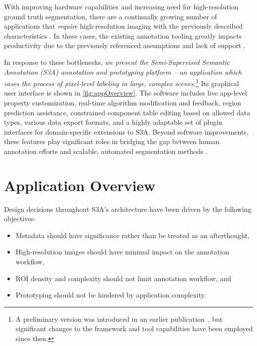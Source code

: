 With improving hardware capabilities and increasing need for high-resolution ground truth segmentation, there are a continually growing number of applications that \emph{require} high-resolution imaging with the previously described characteristics \citep{Mohajerani_cloudRemoteSensing,Demochkina_improvingOneShotXray}.
In these cases, the existing annotation tooling greatly impacts productivity due to the previously referenced assumptions and lack of support \citep{SpaceNet2020-lb}.

In response to these bottlenecks, \emph{we present the Semi-Supervised Semantic Annotation (S3A) annotation and prototyping platform -- an application which eases the process of pixel-level labeling in large, complex scenes.}\footnote{A preliminary version was introduced in an earlier publication~\citep{jessurunComponentDetectionEvaluation2020}, but significant changes to the framework and tool capabilities have been employed since then.}
Its graphical user interface is shown in \autoref{fig:appOverview}.
The software includes live app-level property customization, real-time algorithm modification and feedback, region prediction assistance, constrained component table editing based on allowed data types, various data export formats, and a highly adaptable set of plugin interfaces for domain-specific extensions to S3A.
Beyond software improvements, these features play significant roles in bridging the gap between human annotation efforts and scalable, automated segmentation methods \citep{Branson_humansInLoop}.

\makeAppOverviewFig

\section{Application Overview}\label{sec:appFeatures}
Design decisions throughout S3A's architecture have been driven by the following objectives:

\begin{itemize}
\item Metadata should have significance rather than be treated as an afterthought,
\item High-resolution images should have minimal impact on the annotation workflow,
\item ROI density and complexity should not limit annotation workflow, and
\item Prototyping should not be hindered by application complexity.
\end{itemize}

